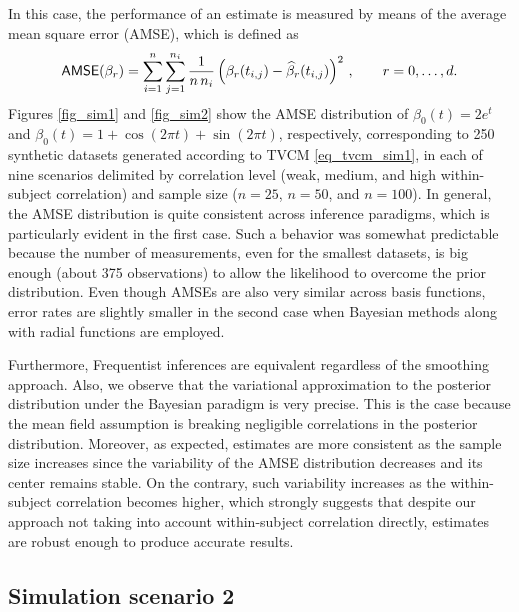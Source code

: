 \documentclass[letterpaper,10pt,openany]{article}
\def\frac#1#2{{{#1}\over{#2}}}
\begin{document}
\newpage

In this case, the performance of an estimate is measured by means of the average mean square error (\textsf{AMSE}), which is defined as
\begin{equation*}
\textsf{AMSE}(\beta_r) = \sum_{i=1}^n\sum_{j=1}^{n_i} \frac{1}{n\,n_i}\left(\beta_r(t_{i,j})-\widehat{\beta}_r(t_{i,j})\right)^2\,,\qquad r=0,\ldots,d.
\end{equation*}
Figures \ref{fig_sim1} and \ref{fig_sim2} show the \textsf{AMSE} distribution of $\beta_0(t) = 2e^t$ and $\beta_0(t) =  1 + \cos(2 \pi t) + \sin(2 \pi t)$, respectively, corresponding to 250 synthetic datasets generated according to \textsf{TVCM} \eqref{eq_tvcm_sim1}, in each of nine scenarios delimited by correlation level (weak, medium, and high within-subject correlation) and sample size ($n=25$, $n = 50$, and $n=100$). In general, the \textsf{AMSE} distribution is quite consistent across inference paradigms, which is particularly evident in the first case. Such a behavior was somewhat predictable because the number of measurements, even for the smallest datasets, is big enough (about 375 observations) to allow the likelihood to overcome the prior distribution. Even though \textsf{AMSE}s are also very similar across basis functions, error rates are slightly smaller in the second case when Bayesian methods along with radial functions are employed. 


Furthermore, Frequentist inferences are equivalent regardless of the smoothing approach. Also, we observe that the variational approximation to the posterior distribution under the Bayesian paradigm is very precise. This is the case because the mean field assumption is breaking negligible correlations in the posterior distribution. Moreover, as expected, estimates are more consistent as the sample size increases since the variability of the \textsf{AMSE} distribution decreases and its center remains stable. On the contrary, such variability increases as the within-subject correlation becomes higher, which strongly suggests that despite our approach not taking into account within-subject correlation directly, estimates are robust enough to produce accurate results. 


\subsection{Simulation scenario 2}
\end{document}
